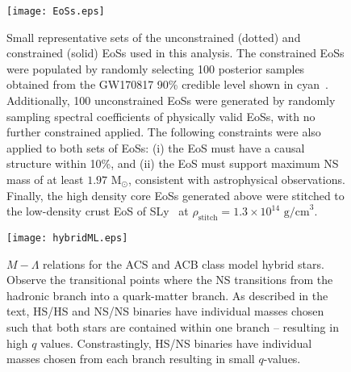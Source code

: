 \documentclass[prd,twocolumn,nofootinbib,superscriptaddress,amsmath,amssymb]{revtex4-1}
\begin{document}
\begin{figure}
\begin{center} 
\texttt{[image: EoSs.eps]}
\end{center}
\caption{
Small representative sets of the unconstrained (dotted) and constrained (solid) EoSs used in this analysis. 
The constrained EoSs were populated by randomly selecting 100 posterior samples obtained from the GW170817 90\% credible level shown in cyan~\cite{LIGO:posterior}.
Additionally, 100 unconstrained EoSs were generated by randomly sampling spectral coefficients of physically valid EoSs, with no further constrained applied.
The following constraints were also applied to both sets of EoSs: (i) the EoS must have a causal structure within 10\%, and (ii) the EoS must support maximum NS mass of at least $1.97 \text{ M}_{\odot}$, consistent with astrophysical observations.
Finally, the high density core EoSs generated above were stitched to the low-density crust EoS of SLy~\cite{Douchin:2001sv} at $\rho_{\text{stitch}}=1.3 \times 10^{14} \text{ g/cm}^3$.
}
\label{fig:eos}
\end{figure} 

\begin{figure}
\begin{center} 
\texttt{[image: hybridML.eps]}
\end{center}
\caption{
$M-\Lambda$ relations for the ACS and ACB class model hybrid stars. 
Observe the transitional points where the NS transitions from the hadronic branch into a quark-matter branch.
As described in the text, HS/HS and NS/NS binaries have individual masses chosen such that both stars are contained within one branch -- resulting in high $q$ values.
Constrastingly, HS/NS binaries have individual masses chosen from each branch resulting in small $q$-values.
}
\label{fig:hybridML}
\end{figure} 
\end{document}
